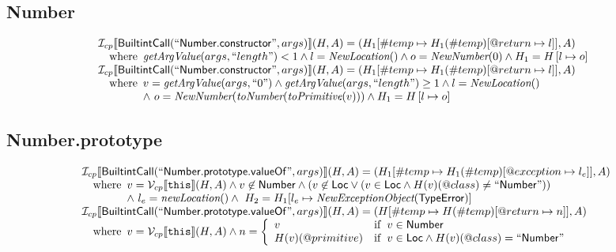 \subsection{Number}
\[
\begin{array}{l}
\mathcal{I} _{cp}\llbracket \mbox{\textsf{BuiltintCall}}(``\mbox{\textsf{Number.constructor}}",args)\rrbracket(H,A)
  = (H_1[\#temp \mapsto H_1(\#temp)[@return \mapsto l]], A)\\
\quad{\rm where}\begin{array}[t]{l}
  \emph{getArgValue}(args, ``length") < 1 
  \land l=\emph{NewLocation}() \land o=\emph{NewNumber}(0) \land H_1=H\left[l\mapsto o\right]
  \end{array}\\
  
\mathcal{I} _{cp}\llbracket \mbox{\textsf{BuiltintCall}}(``\mbox{\textsf{Number.constructor}}",args)\rrbracket(H,A)
  = (H_1[\#temp \mapsto H_1(\#temp)[@return \mapsto l]], A)\\
\quad{\rm where}\begin{array}[t]{l}
  v = \emph{getArgValue}(args, ``0") \land \emph{getArgValue}(args, ``length") \geq 1
  \land l=\emph{NewLocation}()\\
  \land\ o=\emph{NewNumber}(\emph{toNumber}(\emph{toPrimitive}(v))) \land H_1=H\left[l\mapsto o\right]
  \end{array}\\

\end{array}
\]


\subsection{Number.prototype}
\[
\begin{array}{l}
\I _{cp}\lbr \SF{BuiltintCall}(``\SF{Number.prototype.valueOf}",args)\rbr(H,A)
  = (H_1[\#temp \mapsto H_1(\#temp)[@exception \mapsto l_e]], A)\\
\quad\wherec{
  v = \V _{cp}\lbr \TT{this}\rbr (H,A) \land v \not\in \SF{Number} \land
  (v \not\in \SF{Loc} \lor (v \in \SF{Loc} \land H(v)(@class) \neq ``\SF{Number}"))\\
  \land\ l_e = \hf{newLocation}() \land\ H_2=H_1[l_e\mapsto\hf{NewExceptionObject}(\SF{TypeError})] 
  }\\

\I _{cp}\lbr \SF{BuiltintCall}(``\SF{Number.prototype.valueOf}",args)\rbr(H,A)
  = (H[\#temp \mapsto H(\#temp)[@return \mapsto n]], A)\\
\quad\wherec{
  v = \V _{cp}\lbr \TT{this}\rbr (H,A)
  \land n = \left\{
    \begin{array}{ll}
      v & \ifc{v \in \SF{Number}}\\
      H(v)(@primitive) & \ifc{v \in \SF{Loc} \land H(v)(@class) = ``\SF{Number}"}
    \end{array}\right.
  }\\
\\\\
\end{array}
\]



